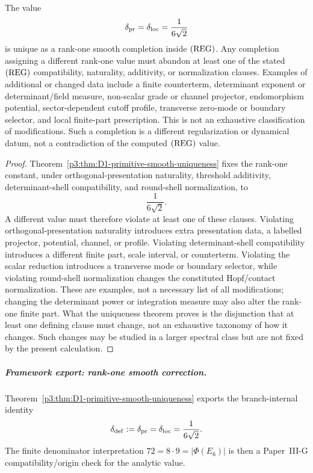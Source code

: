 \documentclass[12pt,a4paper]{article}
\begin{document}
\begin{corollary}
\label{p3:cor:non-D1-smooth-completions-are-insertions}
The value
\[
        \delta_{\rm pr}=\delta_{\rm loc}=\frac{1}{6\sqrt2}
\]
is unique as a rank-one smooth completion inside \(({\rm REG})\).
Any completion assigning a different rank-one value must abandon at least one
of the stated \(({\rm REG})\) compatibility, naturality, additivity, or
normalization clauses. Examples of additional or changed data include a finite
counterterm, determinant exponent or determinant/field measure, non-scalar
grade or channel projector, endomorphism potential, sector-dependent cutoff
profile, transverse zero-mode or boundary selector, and local finite-part
prescription. This is not an exhaustive classification of modifications.  Such a completion is
a different regularization or dynamical datum, not a contradiction of the
computed \(({\rm REG})\) value.
\end{corollary}

\begin{proof}
Theorem~\ref{p3:thm:D1-primitive-smooth-uniqueness} fixes the rank-one
constant, under orthogonal-presentation naturality, threshold additivity,
determinant-shell compatibility, and round-shell normalization, to
\[
 \frac{1}{6\sqrt2}.
\]
A different value must therefore violate at least one of these clauses.
Violating orthogonal-presentation naturality introduces extra presentation data, a labelled projector, potential,
channel, or profile.  Violating determinant-shell compatibility introduces a
different finite part, scale interval, or counterterm.  Violating the scalar
reduction introduces a transverse mode or boundary selector, while violating
round-shell normalization changes the constituted Hopf/contact normalization.
These are examples, not a necessary list of all modifications; changing the
determinant power or integration measure may also alter the rank-one finite
part. What the uniqueness theorem proves is the disjunction that at least
one defining clause must change, not an exhaustive taxonomy of how it changes.
Such changes may be studied in a larger spectral class but are not fixed by
the present calculation.
\end{proof}

\subparagraph{Framework export: rank-one smooth correction.}
Theorem~\ref{p3:thm:D1-primitive-smooth-uniqueness} exports the branch-internal identity
\[
        \delta_{\mathrm{def}}:=\delta_{\rm pr}=\delta_{\rm loc}=\frac1{6\sqrt2}.
\]
The finite denominator interpretation \(72=8\cdot9=|\Phi(E_6)|\) is then a Paper~III-G compatibility/origin check for the analytic value.
\end{document}
